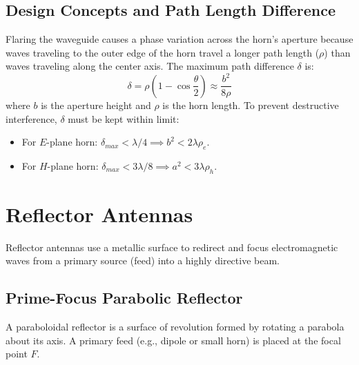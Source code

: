 \documentclass[12pt,a4paper]{article}
\begin{document}
\subsection{Design Concepts and Path Length Difference}
Flaring the waveguide causes a phase variation across the horn's aperture because waves traveling to the outer edge of the horn travel a longer path length ($\rho$) than waves traveling along the center axis. 
The maximum path difference $\delta$ is:
\[
\delta = \rho \left( 1 - \cos\frac{\theta}{2} \right) \approx \frac{b^2}{8\rho}
\]
where $b$ is the aperture height and $\rho$ is the horn length.
To prevent destructive interference, $\delta$ must be kept within limit:
\begin{itemize}[leftmargin=*, itemsep=2pt]
  \item For $E$-plane horn: $\delta_{max} < \lambda / 4 \implies b^2 < 2 \lambda \rho_e$.
  \item For $H$-plane horn: $\delta_{max} < 3\lambda / 8 \implies a^2 < 3 \lambda \rho_h$.
\end{itemize}

\section{Reflector Antennas}

Reflector antennas use a metallic surface to redirect and focus electromagnetic waves from a primary source (feed) into a highly directive beam.

\subsection{Prime-Focus Parabolic Reflector}
A paraboloidal reflector is a surface of revolution formed by rotating a parabola about its axis. A primary feed (e.g., dipole or small horn) is placed at the focal point $F$.
\end{document}
